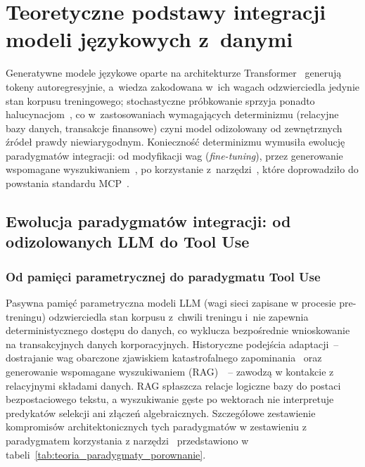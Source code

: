\chapter{Teoretyczne podstawy integracji modeli językowych z~danymi}
\label{chap:teoria}

Generatywne modele językowe oparte na architekturze Transformer~\cite{vaswani2017attention} generują tokeny autoregresyjnie, a~wiedza zakodowana w~ich wagach odzwierciedla jedynie stan korpusu treningowego; stochastyczne próbkowanie sprzyja ponadto halucynacjom~\cite{mialon2023augmented}, co w~zastosowaniach wymagających determinizmu (relacyjne bazy danych, transakcje finansowe) czyni model odizolowany od zewnętrznych źródeł prawdy niewiarygodnym. Konieczność determinizmu wymusiła ewolucję paradygmatów integracji: od modyfikacji wag (\emph{fine-tuning}), przez generowanie wspomagane wyszukiwaniem~\cite{lewis2020rag}, po korzystanie z~narzędzi~\cite{schick2023toolformer}, które doprowadziło do powstania standardu MCP~\cite{mcp_spec}.


\section{Ewolucja paradygmatów integracji: od odizolowanych LLM do Tool Use}
\label{sec:teoria_ewolucja_paradygmatow}

\subsection{Od pamięci parametrycznej do paradygmatu Tool Use}
\label{subsec:teoria_finetuning_rag}

Pasywna pamięć parametryczna modeli LLM (wagi sieci zapisane w procesie pre-treningu) odzwierciedla stan korpusu z~chwili treningu i~nie zapewnia deterministycznego dostępu do danych, co wyklucza bezpośrednie wnioskowanie na transakcyjnych danych korporacyjnych. Historyczne podejścia adaptacji~-- dostrajanie wag obarczone zjawiskiem katastrofalnego zapominania~\cite{kirkpatrick2017overcoming} oraz generowanie wspomagane wyszukiwaniem (RAG)~\cite{lewis2020rag}~-- zawodzą w kontakcie z relacyjnymi składami danych. RAG spłaszcza relacje logiczne bazy do postaci bezpostaciowego tekstu, a wyszukiwanie gęste po wektorach nie interpretuje predykatów selekcji ani złączeń algebraicznych. Szczegółowe zestawienie kompromisów architektonicznych tych paradygmatów w zestawieniu z paradygmatem korzystania z narzędzi~\cite{qin2023toollearning} przedstawiono w tabeli~\ref{tab:teoria_paradygmaty_porownanie}.

